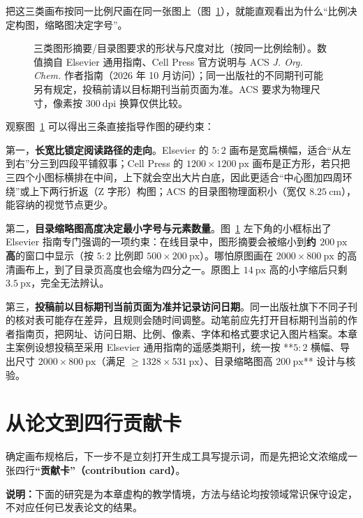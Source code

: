 把这三类画布按同一比例尺画在同一张图上（图~\ref{fig:ch10-01}），就能直观看出为什么“比例决定构图，缩略图决定字号”。

\begin{figure}[htbp]\centering
\resizebox{\linewidth}{!}{}
\caption{三类图形摘要/目录图要求的形状与尺度对比（按同一比例绘制）。数值摘自 Elsevier 通用指南、Cell Press 官方说明与 ACS \textit{J. Org. Chem.} 作者指南（2026 年 10 月访问）；同一出版社的不同期刊可能另有规定，投稿前请以目标期刊当前页面为准。ACS 要求为物理尺寸，像素按 $300\ \text{dpi}$ 换算仅供比较。}\label{fig:ch10-01}
\end{figure}

观察图~\ref{fig:ch10-01} 可以得出三条直接指导作图的硬约束：

第一，\textbf{长宽比锁定阅读路径的走向}。Elsevier 的 $5:2$ 画布是宽扁横幅，适合“从左到右”分三到四段平铺叙事；Cell Press 的 $1200 \times 1200\ \text{px}$ 画布是正方形，若只把三四个小图标横排在中间，上下就会空出大片白底，因此更适合“中心图加四周环绕”或上下两行折返（Z 字形）构图；ACS 的目录图物理面积小（宽仅 $8.25\ \text{cm}$），能容纳的视觉节点更少。

第二，\textbf{目录缩略图高度决定最小字号与元素数量}。图~\ref{fig:ch10-01} 左下角的小框标出了 Elsevier 指南专门强调的一项约束：在线目录中，图形摘要会被缩小到\textbf{约 $200\ \text{px}$ 高}的窗口中显示（按 $5:2$ 比例即 $500 \times 200\ \text{px}$）。哪怕原图画在 $2000 \times 800\ \text{px}$ 的高清画布上，到了目录页高度也会缩为四分之一。原图上 $14\ \text{px}$ 高的小字缩后只剩 $3.5\ \text{px}$，完全无法辨认。

第三，\textbf{投稿前以目标期刊当前页面为准并记录访问日期}。同一出版社旗下不同子刊的核对表可能存在差异，且规则会随时间调整。动笔前应先打开目标期刊当前的作者指南页，把网址、访问日期、比例、像素、字体和格式要求记入图片档案。本章主案例设想投稿至采用 Elsevier 通用指南的遥感类期刊，统一按 **$5:2$ 横幅、导出尺寸 $2000 \times 800\ \text{px}$（满足 $\ge 1328 \times 531\ \text{px}$）、目录缩略图高 $200\ \text{px}$** 设计与核验。

\section{从论文到四行贡献卡}

确定画布规格后，下一步不是立刻打开生成工具写提示词，而是先把论文浓缩成一张四行\textbf{“贡献卡”（contribution card）}。

\begin{BookNote}
\textbf{说明：}下面的研究是为本章虚构的教学情境，方法与结论均按领域常识保守设定，不对应任何已发表论文的结果。
\end{BookNote}

